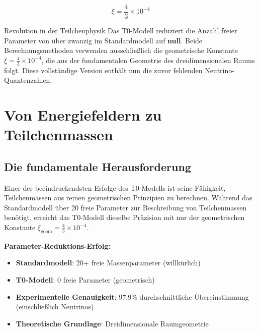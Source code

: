 \documentclass[12pt,a4paper]{article}
\newcommand{\xigeom}{\xi_{\text{geom}}}
\newcommand{\xipar}{\xi}
\begin{document}
	\begin{equation}
		\xi = \frac{4}{3} \times 10^{-4}
		\label{eq:fundamental_constant}
	\end{equation}
	
	\begin{important}{Revolution in der Teilchenphysik}{}
		Das T0-Modell reduziert die Anzahl freier Parameter von über zwanzig im Standardmodell auf \textbf{null}. Beide Berechnungsmethoden verwenden ausschließlich die geometrische Konstante $\xipar = \frac{4}{3} \times 10^{-4}$, die aus der fundamentalen Geometrie des dreidimensionalen Raums folgt. Diese vollständige Version enthält nun die zuvor fehlenden Neutrino-Quantenzahlen.
	\end{important}
	
	\section{Von Energiefeldern zu Teilchenmassen}
	\label{sec:energy_fields_to_masses}
	
	\subsection{Die fundamentale Herausforderung}
	\label{subsec:fundamental_challenge}
	
	Einer der beeindruckendsten Erfolge des T0-Modells ist seine Fähigkeit, Teilchenmassen aus reinen geometrischen Prinzipien zu berechnen. Während das Standardmodell über 20 freie Parameter zur Beschreibung von Teilchenmassen benötigt, erreicht das T0-Modell dieselbe Präzision mit nur der geometrischen Konstante $\xigeom = \frac{4}{3} \times 10^{-4}$.
	
	\begin{tcolorbox}[colback=green!5!white,colframe=green!75!black,title=Massen-Revolution]
		\textbf{Parameter-Reduktions-Erfolg:}
		\begin{itemize}
			\item \textbf{Standardmodell}: 20+ freie Massenparameter (willkürlich)
			\item \textbf{T0-Modell}: 0 freie Parameter (geometrisch)
			\item \textbf{Experimentelle Genauigkeit}: 97,9\% durchschnittliche Übereinstimmung (einschließlich Neutrinos)
			\item \textbf{Theoretische Grundlage}: Dreidimensionale Raumgeometrie
		\end{itemize}
	\end{tcolorbox}
	
\end{document}

